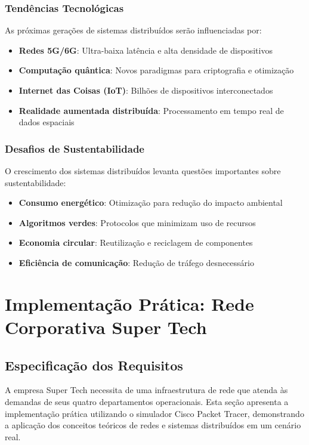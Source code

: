 \subsubsection{Tendências Tecnológicas}

As próximas gerações de sistemas distribuídos serão influenciadas por:

\begin{itemize}
    \item \textbf{Redes 5G/6G}: Ultra-baixa latência e alta densidade de dispositivos
    \item \textbf{Computação quântica}: Novos paradigmas para criptografia e otimização
    \item \textbf{Internet das Coisas (IoT)}: Bilhões de dispositivos interconectados
    \item \textbf{Realidade aumentada distribuída}: Processamento em tempo real de dados espaciais
\end{itemize}

\subsubsection{Desafios de Sustentabilidade}

O crescimento dos sistemas distribuídos levanta questões importantes sobre sustentabilidade:

\begin{itemize}
    \item \textbf{Consumo energético}: Otimização para redução do impacto ambiental
    \item \textbf{Algoritmos verdes}: Protocolos que minimizam uso de recursos
    \item \textbf{Economia circular}: Reutilização e reciclagem de componentes
    \item \textbf{Eficiência de comunicação}: Redução de tráfego desnecessário
\end{itemize}

\section{Implementação Prática: Rede Corporativa Super Tech}

\subsection{Especificação dos Requisitos}

A empresa Super Tech necessita de uma infraestrutura de rede que atenda às demandas de seus quatro departamentos operacionais. Esta seção apresenta a implementação prática utilizando o simulador Cisco Packet Tracer, demonstrando a aplicação dos conceitos teóricos de redes e sistemas distribuídos em um cenário real.

